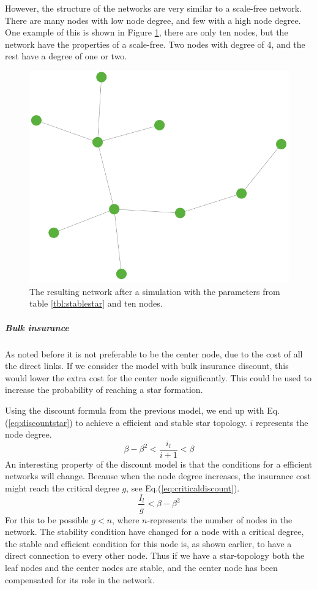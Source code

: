 However, the structure of the networks are very similar to a scale-free network. There are many nodes with low node degree, and few with a high node degree.
One example of this is shown in Figure \ref{fig:stablescalefree}, there are only ten nodes, but the network have the properties of a scale-free. Two nodes with degree of 4, and the rest have a degree of one or two.
\begin{figure}[h]
\centering
  \includegraphics[width=0.5\linewidth]{../Figures/stability/Unefficientbutstabletwo.png}
  \caption{\label{fig:stablescalefree} The resulting network after a simulation with the parameters from table \ref{tbl:stablestar} and ten nodes.}
\end{figure}
\subparagraph{Bulk insurance}
As noted before it is not preferable to be the center node, due to the cost of all the direct links. If we consider the model with bulk insurance discount, this would lower the extra cost for the center node significantly. This could be used to increase the probability of reaching a star formation. 

Using the discount formula from the previous model, we end up with Eq.(\ref{eq:discountstar}) to achieve a efficient and stable star topology. $i$ represents the node degree.
\begin{equation}
\beta-\beta^2<\frac{i_{l}}{i+1}< \beta
\label{eq:discountstar}
\end{equation}
An interesting property of the discount model is that the conditions for a efficient networks will change. Because
when the node degree increases, the insurance cost might reach the critical degree $g$, see Eq.(\ref{eq:criticaldiscount}). 
\begin{equation}
\frac{I_{l}}{g}<\beta-\beta^2
\label{eq:criticaldiscount}
\end{equation}
For this to be possible $g<n$, where $n$-represents the number of nodes in the network.
The stability condition have changed for a node with a critical degree, the stable and efficient condition for this node is, as shown earlier, to have a direct connection to every other node. Thus if we have a star-topology both the leaf nodes and the center nodes are stable, and the center node has been compensated for its role in the network.

